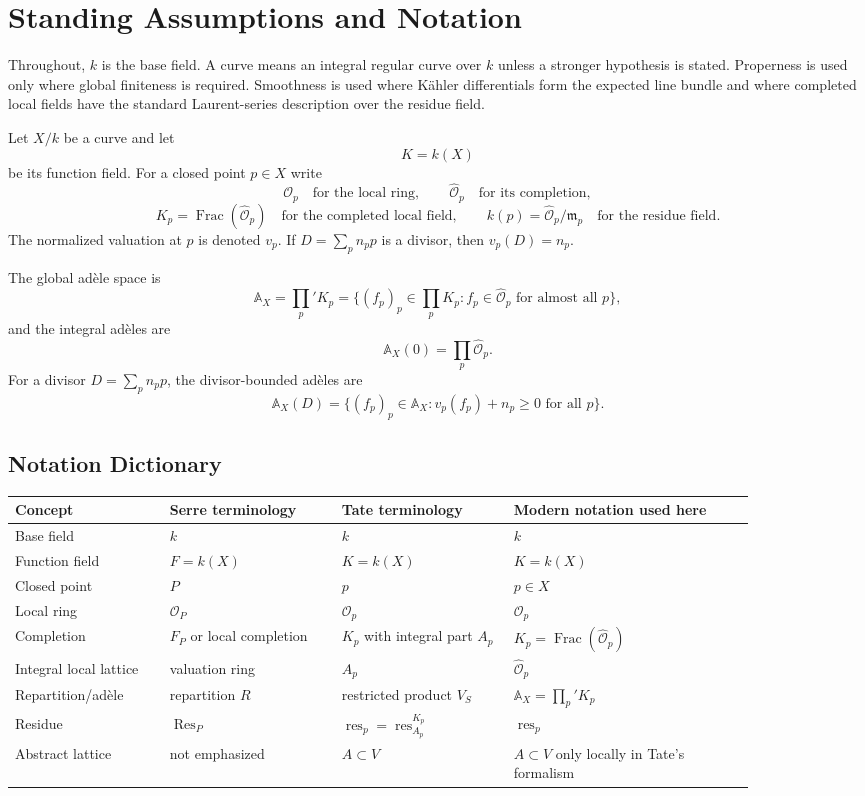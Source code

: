 \documentclass[11pt,a4paper]{article}
\newcommand{\OO}{\mathcal O}
\newcommand{\wideO}{\widehat{\mathcal O}}
\newcommand{\AX}{\mathbb A_X}
\newcommand{\Frac}{\operatorname{Frac}}
\newcommand{\res}{\operatorname{res}}
\theoremstyle{definition}
\theoremstyle{plain}
\theoremstyle{remark}
\begin{document}
\section{Standing Assumptions and Notation}

Throughout, $k$ is the base field.  A curve means an integral regular curve over $k$ unless a stronger hypothesis is stated.  Properness is used only where global finiteness is required.  Smoothness is used where Kähler differentials form the expected line bundle and where completed local fields have the standard Laurent-series description over the residue field.

Let $X/k$ be a curve and let
\[
  K=k(X)
\]
be its function field.  For a closed point $p\in X$ write
\[
  \OO_p \quad \text{for the local ring},\qquad
  \wideO_p \quad \text{for its completion},
\]
\[
  K_p=\Frac(\wideO_p) \quad \text{for the completed local field},\qquad
  k(p)=\wideO_p/\mathfrak m_p \quad \text{for the residue field}.
\]
The normalized valuation at $p$ is denoted $v_p$.  If $D=\sum_p n_p p$ is a divisor, then $v_p(D)=n_p$.

The global adèle space is
\[
  \AX=\prod_p' K_p
  =\{(f_p)_p\in \prod_p K_p : f_p\in \wideO_p \text{ for almost all }p\},
\]
and the integral adèles are
\[
  \AX(0)=\prod_p \wideO_p.
\]
For a divisor $D=\sum_p n_p p$, the divisor-bounded adèles are
\[
  \AX(D)=\{(f_p)_p\in \AX : v_p(f_p)+n_p\ge 0\text{ for all }p\}.
\]

\subsection*{Notation Dictionary}

\begin{center}
\small
\begin{tabular}{L{0.18\linewidth}L{0.20\linewidth}L{0.20\linewidth}L{0.28\linewidth}}
\toprule
Concept & Serre terminology & Tate terminology & Modern notation used here \\
\midrule
Base field & $k$ & $k$ & $k$ \\
Function field & $F=k(X)$ & $K=k(X)$ & $K=k(X)$ \\
Closed point & $P$ & $p$ & $p\in X$ \\
Local ring & $\OO_P$ & $\OO_p$ & $\OO_p$ \\
Completion & $F_P$ or local completion & $K_p$ with integral part $A_p$ & $K_p=\Frac(\wideO_p)$ \\
Integral local lattice & valuation ring & $A_p$ & $\wideO_p$ \\
Repartition/adèle & repartition $R$ & restricted product $V_S$ & $\AX=\prod_p'K_p$ \\
Residue & $\operatorname{Res}_P$ & $\res_p=\res_{A_p}^{K_p}$ & $\res_p$ \\
Abstract lattice & not emphasized & $A\subset V$ & $A\subset V$ only locally in Tate's formalism \\
\bottomrule
\end{tabular}
\end{center}
\end{document}
